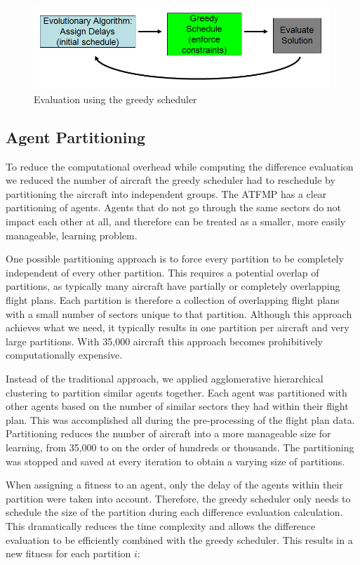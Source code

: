 \documentclass{sig-alternate}
\begin{document}
\begin{figure}[tbh!]
\centering
\includegraphics[width=.9\columnwidth]{LearningCycle}
\caption{Evaluation using the greedy scheduler}
\label{LearningCycle}
\end{figure}


\subsection{Agent Partitioning}
To reduce the computational overhead while computing the difference evaluation we reduced the number of aircraft the greedy scheduler had to reschedule by partitioning the aircraft into independent groups. The ATFMP has a clear partitioning of agents. Agents that do not go through the same sectors do not impact each other at all, and therefore can be treated as a smaller, more easily manageable, learning problem. 

One possible partitioning approach is to force every partition to be completely independent of every other partition. This requires a potential overlap of partitions, as typically many aircraft have partially or completely overlapping flight plans. Each partition is therefore a collection of overlapping flight plans with a small number of sectors unique to that partition. Although this approach achieves what we need, it typically results in one partition per aircraft and very large partitions. With 35,000 aircraft this approach becomes prohibitively computationally expensive.

Instead of the traditional approach, we applied agglomerative hierarchical clustering \cite{Agglomerative} to partition similar agents together. Each agent was partitioned with other agents based on the number of similar sectors they had within their flight plan. This was accomplished all during the pre-processing of the flight plan data. Partitioning reduces the number of aircraft into a more manageable size for learning, from 35,000 to on the order of hundreds or thousands.  The partitioning was stopped and saved at every iteration to obtain a varying size of partitions. 

When assigning a fitness to an agent, only the delay of the agents within their partition were taken into account. Therefore, the greedy scheduler only needs to schedule the size of the partition during each difference evaluation calculation. This dramatically reduces the time complexity and allows the difference evaluation to be efficiently combined with the greedy scheduler. This results in a new fitness for each partition $i$:
\end{document}
